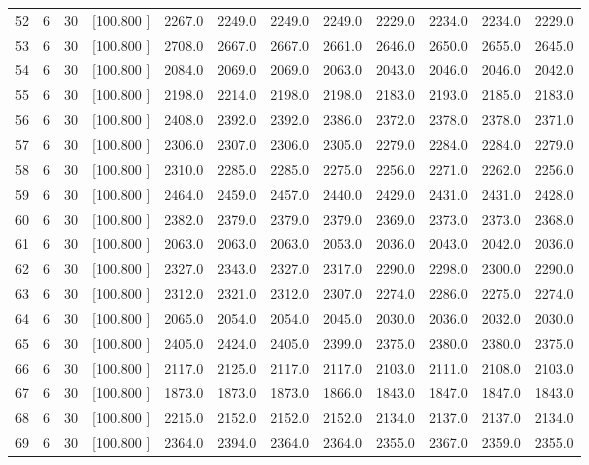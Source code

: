 \documentclass[12pt,a4paper]{article}
\begin{document}
\begin{center}
{\begin{tabular}{r r r r r r r r r r r r}
  52&  6& 30&[100.800   ]&  2267.0&  2249.0&  2249.0&  2249.0&  2229.0&  2234.0&  2234.0&  2229.0\\[-0.02in]
  53&  6& 30&[100.800   ]&  2708.0&  2667.0&  2667.0&  2661.0&  2646.0&  2650.0&  2655.0&  2645.0\\[-0.02in]
  54&  6& 30&[100.800   ]&  2084.0&  2069.0&  2069.0&  2063.0&  2043.0&  2046.0&  2046.0&  2042.0\\[-0.02in]
  55&  6& 30&[100.800   ]&  2198.0&  2214.0&  2198.0&  2198.0&  2183.0&  2193.0&  2185.0&  2183.0\\[-0.02in]
  56&  6& 30&[100.800   ]&  2408.0&  2392.0&  2392.0&  2386.0&  2372.0&  2378.0&  2378.0&  2371.0\\[-0.02in]
  57&  6& 30&[100.800   ]&  2306.0&  2307.0&  2306.0&  2305.0&  2279.0&  2284.0&  2284.0&  2279.0\\[-0.02in]
  58&  6& 30&[100.800   ]&  2310.0&  2285.0&  2285.0&  2275.0&  2256.0&  2271.0&  2262.0&  2256.0\\[-0.02in]
  59&  6& 30&[100.800   ]&  2464.0&  2459.0&  2457.0&  2440.0&  2429.0&  2431.0&  2431.0&  2428.0\\[-0.02in]
  60&  6& 30&[100.800   ]&  2382.0&  2379.0&  2379.0&  2379.0&  2369.0&  2373.0&  2373.0&  2368.0\\[-0.02in]
  61&  6& 30&[100.800   ]&  2063.0&  2063.0&  2063.0&  2053.0&  2036.0&  2043.0&  2042.0&  2036.0\\[-0.02in]
  62&  6& 30&[100.800   ]&  2327.0&  2343.0&  2327.0&  2317.0&  2290.0&  2298.0&  2300.0&  2290.0\\[-0.02in]
  63&  6& 30&[100.800   ]&  2312.0&  2321.0&  2312.0&  2307.0&  2274.0&  2286.0&  2275.0&  2274.0\\[-0.02in]
  64&  6& 30&[100.800   ]&  2065.0&  2054.0&  2054.0&  2045.0&  2030.0&  2036.0&  2032.0&  2030.0\\[-0.02in]
  65&  6& 30&[100.800   ]&  2405.0&  2424.0&  2405.0&  2399.0&  2375.0&  2380.0&  2380.0&  2375.0\\[-0.02in]
  66&  6& 30&[100.800   ]&  2117.0&  2125.0&  2117.0&  2117.0&  2103.0&  2111.0&  2108.0&  2103.0\\[-0.02in]
  67&  6& 30&[100.800   ]&  1873.0&  1873.0&  1873.0&  1866.0&  1843.0&  1847.0&  1847.0&  1843.0\\[-0.02in]
  68&  6& 30&[100.800   ]&  2215.0&  2152.0&  2152.0&  2152.0&  2134.0&  2137.0&  2137.0&  2134.0\\[-0.02in]
  69&  6& 30&[100.800   ]&  2364.0&  2394.0&  2364.0&  2364.0&  2355.0&  2367.0&  2359.0&  2355.0\\[-0.02in]

\end{tabular}}
\end{center}
\end{document}
